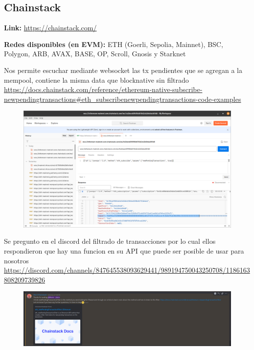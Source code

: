 \clearpage
\subsection{Chainstack}

\textbf{Link:} \url{https://chainstack.com/}

\textbf{Redes disponibles (en EVM):} ETH (Goerli, Sepolia, Mainnet), BSC, Polygon, ARB, AVAX, BASE, OP, Scroll, Gnosis y  Starknet

\medskip

Nos permite escuchar mediante websocket las tx pendientes que se agregan a la mempool, contiene la misma data que blocknative sin filtrado \url{https://docs.chainstack.com/reference/ethereum-native-subscribe-newpendingtransactions#eth_subscribenewpendingtransactions-code-examples}

\begin{figure}
    \centering
    \includegraphics[width=1\linewidth]{img//screenshots/Screenshot from 2023-12-16 00-35-17.png}
\end{figure}

Se pregunto en el discord del filtrado de transacciones por lo cual ellos respondieron que hay una funcion en su API que puede ser posible de usar para nosotros \url{https://discord.com/channels/847645538093629441/989194750043250708/1186163808209739826}

\begin{figure}
    \centering
    \includegraphics[width=1\linewidth]{img//screenshots/Screenshot from 2023-12-18 13-15-12.png}
\end{figure}

